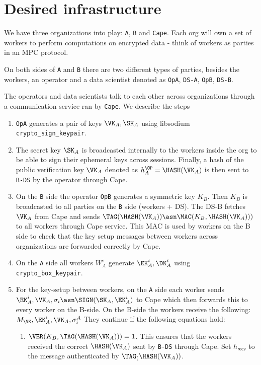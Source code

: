\section{Desired infrastructure}

We have three organizations into play: \verb|A|, \verb|B| and \verb|Cape|.
Each org will own a set of workers to perform computations on encrypted data
- think of workers as parties in an MPC protocol.

On both sides of \verb|A| and \verb|B| there are two
different types of parties, besides the workers, an operator and a data
scientist denoted as \verb|OpA|, \verb|DS-A|, \verb|OpB|, \verb|DS-B|.

The operators and data scientists talk to each other across organizations through a
communication service ran by \verb|Cape|.
We describe the steps
\begin{enumerate}
  \item \verb|OpA| generates a pair of keys $\VK_A, \SK_A$
  using libsodium \verb|crypto_sign_keypair|.
  \item The secret key $\SK_A$ is broadcasted internally to the workers
  inside the org to be able to sign their ephemeral keys across sessions.
  Finally, a hash of the public verification key $\VK_A$
  denoted as $h_A^\OP = \HASH(\VK_A)$
  is then sent to \verb|B-DS| by the operator through Cape.

  \item On the \verb|B| side the operator \verb|OpB| generates a symmetric key $K_B$.
  Then $K_B$ is broadcasted to all parties on the \verb|B| side (workers +
  DS). The DS-B fetches $\VK_A$ from Cape and sends $\TAG(\HASH(\VK_A)) \asn
  \MAC(K_B, \HASH(\VK_A)))$ to all workers through Cape service. This MAC is
  used by workers on the B side to check that the key setup messages between
  workers across organizations are forwarded correctly by Cape.

  \item On the \verb|A| side all workers $W_A^i$ generate $\EK_A^i, \DK_A^i$
  using \verb|crypto_box_keypair|.

  \item For the key-setup between workers, on the \verb|A| side each worker
  sends $\EK_A^i, \VK_A, \sigma_i \asn \SIGN(\SK_A, \EK_A^i)$ to Cape which
  then forwards this to every worker on the B-side. On the B-side the workers
  receive the following: $M_\VK, \EK_A^i, \VK_A, \sigma^A_i$ They continue if
  the following equations hold:

  \begin{enumerate}
    \item $\VER(K_B, \TAG(\HASH(\VK_A))) = 1$. This ensures that the workers
    received the correct $\HASH(\VK_A)$ sent by \verb|B-DS| through Cape. Set
    $h_\mathsf{recv}$ to the message authenticated by $\TAG_(\HASH(\VK_A))$.


\end{enumerate}
\end{enumerate}
